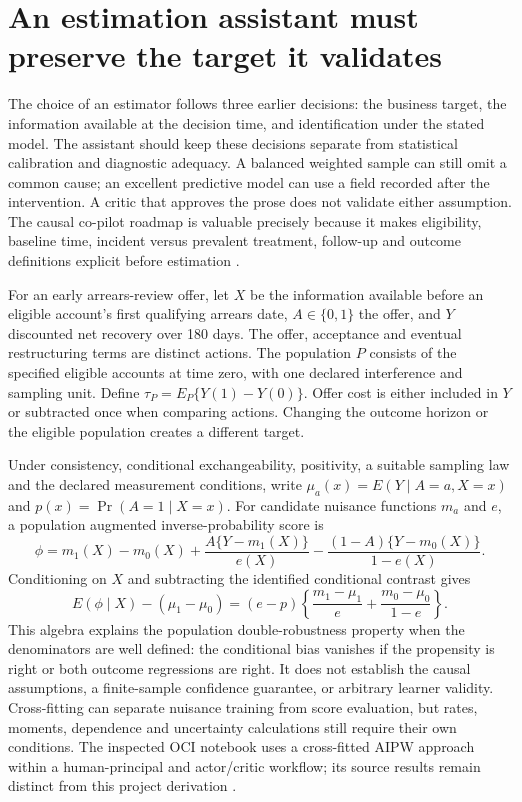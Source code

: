 \section{An estimation assistant must preserve the target it validates}
\label{exec14:estimation-validation}

The choice of an estimator follows three earlier decisions: the business target,
the information available at the decision time, and identification under the
stated model. The assistant should keep these decisions separate from statistical
calibration and diagnostic adequacy. A balanced weighted sample can still omit
a common cause; an excellent predictive model can use a field recorded after
the intervention. A critic that approves the prose does not validate either
assumption. The causal co-pilot roadmap is valuable precisely because it makes
eligibility, baseline time, incident versus prevalent treatment, follow-up and
outcome definitions explicit before estimation \citep{v12_la_2407_19118}.

For an early arrears-review offer, let $X$ be the information available before
an eligible account's first qualifying arrears date, $A\in\{0,1\}$ the offer,
and $Y$ discounted net recovery over 180 days. The offer, acceptance and eventual
restructuring terms are distinct actions. The population $P$ consists of the
specified eligible accounts at time zero, with one declared interference and
sampling unit. Define $\tau_P=E_P\{Y(1)-Y(0)\}$. Offer cost is either included
in $Y$ or subtracted once when comparing actions. Changing the outcome horizon
or the eligible population creates a different target.

Under consistency, conditional exchangeability, positivity, a suitable sampling
law and the declared measurement conditions, write
$\mu_a(x)=E(Y\mid A=a,X=x)$ and $p(x)=\Pr(A=1\mid X=x)$. For candidate nuisance
functions $m_a$ and $e$, a population augmented inverse-probability score is
\[
 \phi=m_1(X)-m_0(X)+\frac{A\{Y-m_1(X)\}}{e(X)}
       -\frac{(1-A)\{Y-m_0(X)\}}{1-e(X)}.
\]
Conditioning on $X$ and subtracting the identified conditional contrast gives
\begin{equation}
 E(\phi\mid X)-(\mu_1-\mu_0)
 =(e-p)\left\{\frac{m_1-\mu_1}{e}
               +\frac{m_0-\mu_0}{1-e}\right\}.
 \label{exec14:aipw-remainder}
\end{equation}
This algebra explains the population double-robustness property when the
denominators are well defined: the conditional bias vanishes if the propensity
is right or both outcome regressions are right. It does not establish the causal
assumptions, a finite-sample confidence guarantee, or arbitrary learner validity.
Cross-fitting can separate nuisance training from score evaluation, but rates,
moments, dependence and uncertainty calculations still require their own
conditions. The inspected OCI notebook uses a cross-fitted AIPW approach within
a human-principal and actor/critic workflow; its source results remain distinct
from this project derivation \citep{v12_la_2607_22443,exec14_estimation_sources}.

